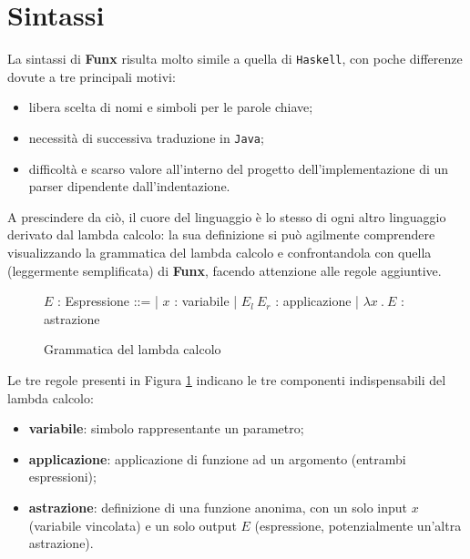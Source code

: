 \section{Sintassi}
\label{sec:2-syntax}

La sintassi di \textbf{Funx} risulta molto simile a quella di \texttt{Haskell}, con poche differenze dovute
a tre principali motivi:
\begin{itemize}
    \item libera scelta di nomi e simboli per le parole chiave;
    \item necessità di successiva traduzione in \texttt{Java};
    \item difficoltà e scarso valore all'interno del progetto dell'implementazione di un parser dipendente dall'indentazione.
\end{itemize}

\noindent A prescindere da ciò, il cuore del linguaggio è lo stesso di ogni altro linguaggio derivato dal lambda calcolo:
la sua definizione si può agilmente comprendere visualizzando la grammatica del lambda calcolo e confrontandola con
quella (leggermente semplificata) di \textbf{Funx}, facendo attenzione alle regole aggiuntive.

\begin{figure}[H]
    \centering
    \vspace{8mm}
    \begin{spacedbnf}
        $E$ : \small{Espressione} ::=
        | $x$ : \small{variabile}
        | $E_l\ E_r$ : \small{applicazione}
        | $\lambda x\ .\ E$ : \small{astrazione}
    \end{spacedbnf}
    \caption{Grammatica del lambda calcolo}
    \label{fig:2-lambda-syntax}
    \vspace{8mm}
\end{figure}

\noindent Le tre regole presenti in Figura \ref{fig:2-lambda-syntax} indicano le tre componenti indispensabili
del lambda calcolo:
\begin{itemize}
    \item \textbf{variabile}: simbolo rappresentante un parametro;
    \item \textbf{applicazione}: applicazione di funzione ad un argomento (entrambi espressioni);
    \item \textbf{astrazione}: definizione di una funzione anonima, con un solo input $x$ (variabile vincolata)
          e un solo output $E$ (espressione, potenzialmente un'altra astrazione).
\end{itemize}

